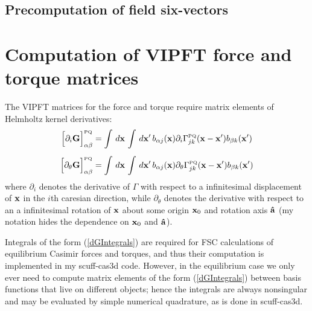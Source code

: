 \documentclass[letterpaper]{article}
\begin{document}
\subsection{Precomputation of field six-vectors}

\section{Computation of VIPFT force and torque matrices}

The VIPFT matrices for the force and torque require matrix
elements of Helmholtz kernel derivatives: 
\begin{subequations}
\begin{align}
 \Big[\partial_i \mathbf{G}\Big]^{\hbox{\tiny{PQ}}}_{\alpha \beta}
&= \int\, d\mathbf{x} \, \int \, d\mathbf{x}^\prime \,
   b_{\alpha j}(\mathbf{x}) \partial_i \Gamma_{jk}^{\hbox{\tiny{PQ}}}(\mathbf{x}-\mathbf{x}^\prime)
   b_{\beta k}(\mathbf{x}^\prime)
\\[5pt]
 \Big[\partial_\theta \mathbf{G}\Big]^{\hbox{\tiny{PQ}}}_{\alpha \beta}
&= \int\, d\mathbf{x} \, \int \, d\mathbf{x}^\prime \,
   b_{\alpha j}(\mathbf{x}) 
   \partial_\theta \Gamma_{jk}^{\hbox{\tiny{PQ}}}(\mathbf{x}-\mathbf{x}^\prime)
   b_{\beta k}(\mathbf{x}^\prime)
\end{align}
\label{dGIntegrals}
\end{subequations}
where $\partial_i$ denotes the derivative of $\Gamma$ 
with respect to a infinitesimal displacement of $\mathbf{x}$
in the $i$th caresian direction, 
while $\partial_\theta$ denotes the derivative with respect to an a
infinitesimal rotation of $\mathbf{x}$ about some origin $\mathbf{x}_0$ and 
rotation axis $\mathbf{\hat a}$ (my notation hides the dependence on 
$\mathbf{x}_0$ and $\mathbf{\hat a}$).

Integrals of the form (\ref{dGIntegrals}) are required for 
FSC calculations of equilibrium Casimir forces and torques,
and thus their computation is implemented in my {\sc scuff-cas3d} code.
However, in the equilibrium case we only ever need to compute
matrix elements of the form (\ref{dGIntegrals}) between basis
functions that live on different objects; hence the integrals
are always nonsingular and may be evaluated by simple 
numerical quadrature, as is done in {\sc scuff-cas3d}.
\end{document}
